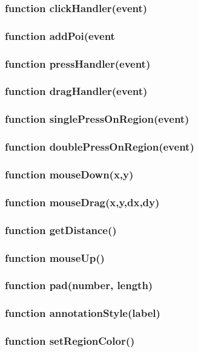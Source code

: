\subsubsection{function clickHandler(event)}
\subsubsection{function addPoi(event}
\subsubsection{function pressHandler(event)}
\subsubsection{function dragHandler(event)}

\subsubsection{function singlePressOnRegion(event)}
\subsubsection{function doublePressOnRegion(event)}
\subsubsection{function mouseDown(x,y)}
\subsubsection{function mouseDrag(x,y,dx,dy)}
\subsubsection{function getDistance()}
\subsubsection{function mouseUp()}
\subsubsection{function pad(number, length)}
\subsubsection{function annotationStyle(label)}
\subsubsection{function setRegionColor()}
